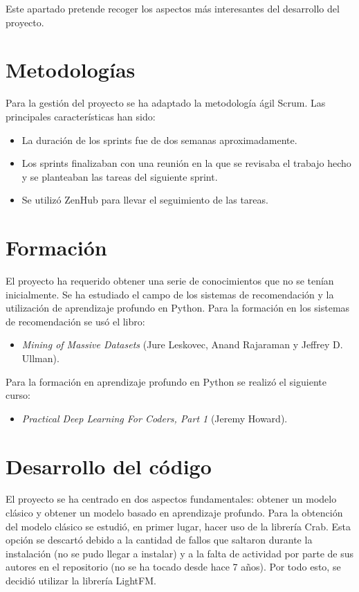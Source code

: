 
Este apartado pretende recoger los aspectos más interesantes del desarrollo del proyecto.

\section{Metodologías}\label{metodologias}
Para la gestión del proyecto se ha adaptado la metodología ágil Scrum. Las principales características han sido:
 \begin{itemize}
\tightlist
\item
	La duración de los sprints fue de dos semanas aproximadamente.
\item
	Los sprints finalizaban con una reunión en la que se revisaba el trabajo hecho y se planteaban las tareas del siguiente sprint.
\item	
	Se utilizó ZenHub para llevar el seguimiento de las tareas.
\end{itemize}

\section{Formación}\label{formacion}
El proyecto ha requerido obtener una serie de conocimientos que no se tenían inicialmente. Se ha estudiado el campo de los sistemas de recomendación y la utilización de aprendizaje profundo en Python.
Para la formación en los sistemas de recomendación se usó el libro:
\begin{itemize}
\tightlist
\item
	\emph{Mining of Massive Datasets} (Jure Leskovec, Anand Rajaraman y Jeffrey D. Ullman).
\end{itemize}
Para la formación en aprendizaje profundo en Python se realizó el siguiente curso:
\begin{itemize}
\tightlist
\item
	\emph{Practical Deep Learning For Coders, Part 1} (Jeremy Howard).
\end{itemize}

\section{Desarrollo del código}\label{desarrollo-codigo}
El proyecto se ha centrado en dos aspectos fundamentales: obtener un modelo clásico y obtener un modelo basado en aprendizaje profundo.
Para la obtención del modelo clásico se estudió, en primer lugar, hacer uso de la librería Crab. Esta opción se descartó debido a la cantidad de fallos que saltaron durante la instalación (no se pudo llegar a instalar) y a la falta de actividad por parte de sus autores en el repositorio (no se ha tocado desde hace 7 años). Por todo esto, se decidió utilizar la librería LightFM.

